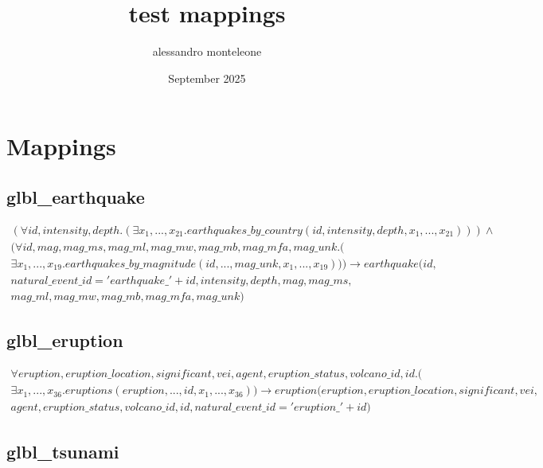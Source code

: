 \documentclass{article}
\title{test mappings}
\author{alessandro monteleone}
\date{September 2025}
\begin{document}
\maketitle

\section{Mappings}


\subsection{glbl\_earthquake}

\begin{multline}
(\forall id, intensity, depth.(
\exists x_1, ..., x_{21}. earthquakes\_by\_country(id, intensity, depth, x_1, ..., x_{21})))  \wedge \\ 
(\forall id, mag, mag\_ms, mag\_ml, mag\_mw, mag\_mb, mag\_mfa, mag\_unk.(\\
\exists x_1, ..., x_{19}. earthquakes\_by\_magnitude(id, ..., mag\_unk, x_1, ..., x_{19}))) \longrightarrow earthquake(id , \\ natural\_event\_id = 'earthquake\_' + id,  intensity, depth, mag, mag\_ms, \\ mag\_ml, mag\_mw, mag\_mb, mag\_mfa, mag\_unk)
\end{multline} 

\subsection{glbl\_eruption}


\begin{multline}
\forall eruption, eruption\_location, significant, vei, agent, eruption\_status, volcano\_id, id.( \\
\exists x_1, ..., x_{36}. eruptions(eruption, ..., id, x_1, ..., x_{36})) \longrightarrow eruption(eruption, eruption\_location, significant, vei, \\ 
agent, eruption\_status, volcano\_id, id , natural\_event\_id = 'eruption\_' + id)
\end{multline}

\subsection{glbl\_tsunami}
\end{document}
